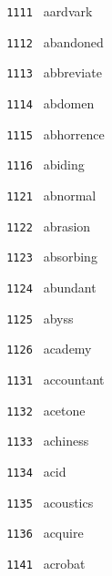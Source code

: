 \documentclass[11pt]{article}
\begin{document}
\begin{multicols}{6}
\small
\noindent \texttt{ 1111 } \hspace{1mm} aardvark  \par
\noindent \texttt{ 1112 } \hspace{1mm} abandoned  \par
\noindent \texttt{ 1113 } \hspace{1mm} abbreviate  \par
\noindent \texttt{ 1114 } \hspace{1mm} abdomen  \par
\noindent \texttt{ 1115 } \hspace{1mm} abhorrence  \par
\noindent \texttt{ 1116 } \hspace{1mm} abiding  \par
\noindent \texttt{ 1121 } \hspace{1mm} abnormal  \par
\noindent \texttt{ 1122 } \hspace{1mm} abrasion  \par
\noindent \texttt{ 1123 } \hspace{1mm} absorbing  \par
\noindent \texttt{ 1124 } \hspace{1mm} abundant  \par
\noindent \texttt{ 1125 } \hspace{1mm} abyss  \par
\noindent \texttt{ 1126 } \hspace{1mm} academy  \par
\noindent \texttt{ 1131 } \hspace{1mm} accountant  \par
\noindent \texttt{ 1132 } \hspace{1mm} acetone  \par
\noindent \texttt{ 1133 } \hspace{1mm} achiness  \par
\noindent \texttt{ 1134 } \hspace{1mm} acid  \par
\noindent \texttt{ 1135 } \hspace{1mm} acoustics  \par
\noindent \texttt{ 1136 } \hspace{1mm} acquire  \par
\noindent \texttt{ 1141 } \hspace{1mm} acrobat  \par

\end{multicols}
\end{document}
